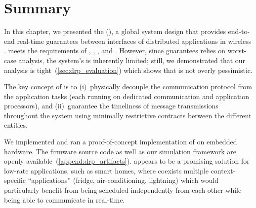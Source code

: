 
\section{Summary}

In this chapter, we presented the \DRPLong (\DRP), a global system design that provides end-to-end real-time guarantees between interfaces of distributed applications in wireless \CPS.
\DRP meets the requirements of , , , and .
However, since \DRP guarantees relies on worst-case analysis, the system's  is inherently limited; still, we demonstrated that our analysis is tight~(\cref{sec:drp_evaluation}) which shows that \DRP is not overly pessimistic.

The key concept of \DRP is to (i)~physically decouple the communication protocol from the application tasks (each running on dedicated communication and application processors), and (ii)~guarantee the timeliness of message transmissions throughout the system using minimally restrictive contracts between the different entities.

We implemented and ran a proof-of-concept implementation of \DRP on embedded hardware.
The firmware source code as well as our \DRP simulation framework are openly available~(\cref{append:drp_artifacts}).
\DRP appears to be a promising solution for low-rate applications, such as smart homes, where  coexists multiple context-specific ``applications'' (\eg fridge, air-conditioning, lightning) which would particularly benefit from being scheduled independently from each other while being able to communicate in real-time.
